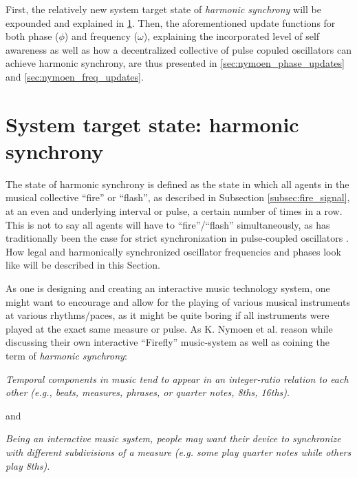 First, the relatively new system target state of \textit{harmonic synchrony} will be expounded and explained in \ref{sec:harmonic_synchrony}. Then, the aforementioned update functions for both phase ($\phi$) and frequency ($\omega$), explaining the incorporated level of self awareness as well as how a decentralized collective of pulse copuled oscillators can achieve harmonic synchrony, are thus presented in \ref{sec:nymoen_phase_updates} and \ref{sec:nymoen_freq_updates}.



\section{System target state: harmonic synchrony}
\label{sec:harmonic_synchrony}

The state of harmonic synchrony is defined \cite{nymoen_synch} as the state in which all agents in the musical collective ``fire'' or ``flash'', as described in Subsection \ref{subsec:fire_signal}, at an even and underlying interval or pulse, a certain number of times in a row. This is not to say all agents will have to ``fire''/``flash'' simultaneously, as has traditionally been the case for strict synchronization in pulse-coupled oscillators \cite{}. How legal and harmonically synchronized oscillator frequencies and phases look like will be described in this Section.

As one is designing and creating an interactive music technology system, one might want to encourage and allow for the playing of various musical instruments at various rhythms/paces, as it might be quite boring if all instruments were played at the exact same measure or pulse. As K. Nymoen et al. \cite{nymoen_synch} reason while discussing their own interactive ``Firefly'' music-system as well as coining the term of \textit{harmonic synchrony}: \nl

\textit{Temporal components in music tend to appear in an integer-ratio relation to each other (e.g., beats, measures, phrases, or quarter notes, 8ths, 16ths)}. \nl

and \nl

\textit{Being an interactive music system, people may want their device to synchronize with different subdivisions of a measure (e.g. some play quarter notes while others play 8ths).} \nl

